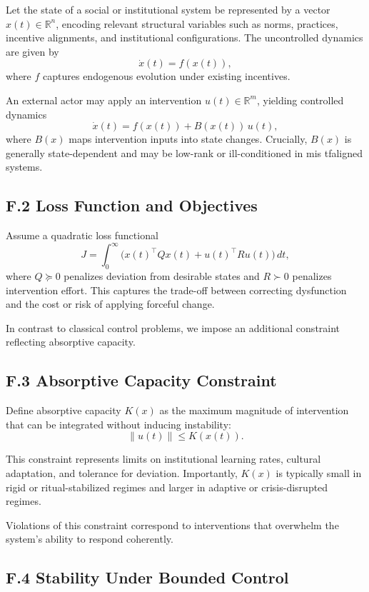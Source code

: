 \documentclass[11pt]{article}
\begin{document}
Let the state of a social or institutional system be represented by a vector \(x(t) \in \mathbb{R}^n\), encoding relevant structural variables such as norms, practices, incentive alignments, and institutional configurations. The uncontrolled dynamics are given by
\[
\dot{x}(t) = f(x(t)),
\]
where \(f\) captures endogenous evolution under existing incentives.

An external actor may apply an intervention \(u(t) \in \mathbb{R}^m\), yielding controlled dynamics
\[
\dot{x}(t) = f(x(t)) + B(x(t))\,u(t),
\]
where \(B(x)\) maps intervention inputs into state changes. Crucially, \(B(x)\) is generally state-dependent and may be low-rank or ill-conditioned in mis	tfaligned systems.

\subsection{F.2 Loss Function and Objectives}

Assume a quadratic loss functional
\[
J = \int_0^\infty \big(x(t)^\top Q x(t) + u(t)^\top R u(t)\big)\,dt,
\]
where \(Q \succeq 0\) penalizes deviation from desirable states and \(R \succ 0\) penalizes intervention effort. This captures the trade-off between correcting dysfunction and the cost or risk of applying forceful change.

In contrast to classical control problems, we impose an additional constraint reflecting absorptive capacity.

\subsection{F.3 Absorptive Capacity Constraint}

Define absorptive capacity \(K(x)\) as the maximum magnitude of intervention that can be integrated without inducing instability:
\[
\|u(t)\| \le K(x(t)).
\]

This constraint represents limits on institutional learning rates, cultural adaptation, and tolerance for deviation. Importantly, \(K(x)\) is typically small in rigid or ritual-stabilized regimes and larger in adaptive or crisis-disrupted regimes.

Violations of this constraint correspond to interventions that overwhelm the system’s ability to respond coherently.

\subsection{F.4 Stability Under Bounded Control}
\end{document}
